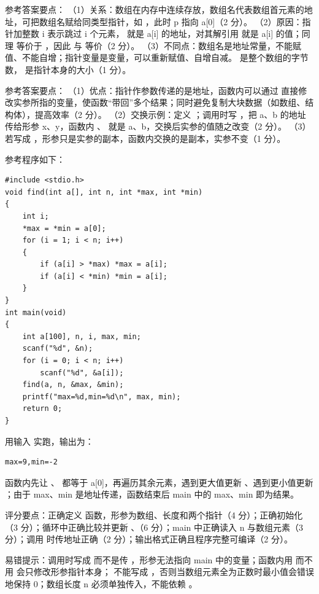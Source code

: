 \documentclass[a4paper,11pt]{article}
\begin{document}
\q 参考答案要点：
（1）关系：数组在内存中连续存放，数组名代表数组首元素的地址，可把数组名赋给同类型指针，如 ，此时 p 指向 a[0]（2 分）。
（2）原因：指针加整数 i 表示跳过 i 个元素， 就是 a[i] 的地址，对其解引用  就是 a[i] 的值；同理  等价于 ，因此  与  等价（2 分）。
（3）不同点：数组名是地址常量，不能赋值、不能自增；指针变量是变量，可以重新赋值、自增自减。 是整个数组的字节数， 是指针本身的大小（1 分）。

\q 参考答案要点：
（1）优点：指针作参数传递的是地址，函数内可以通过  直接修改实参所指的变量，使函数“带回”多个结果；同时避免复制大块数据（如数组、结构体），提高效率（2 分）。
（2）交换示例：定义 ；调用时写 ，把 a、b 的地址传给形参 x、y，函数内 、 就是 a、b，交换后实参的值随之改变（2 分）。
（3）若写成 ，形参只是实参的副本，函数内交换的是副本，实参不变（1 分）。


\q 参考程序如下：
\begin{lstlisting}[language={[custom]C}]
#include <stdio.h>
void find(int a[], int n, int *max, int *min)
{
    int i;
    *max = *min = a[0];
    for (i = 1; i < n; i++)
    {
        if (a[i] > *max) *max = a[i];
        if (a[i] < *min) *min = a[i];
    }
}
int main(void)
{
    int a[100], n, i, max, min;
    scanf("%d", &n);
    for (i = 0; i < n; i++)
        scanf("%d", &a[i]);
    find(a, n, &max, &min);
    printf("max=%d,min=%d\n", max, min);
    return 0;
}
\end{lstlisting}
\begin{analysis}用输入  实跑，输出为：
\begin{lstlisting}
max=9,min=-2
\end{lstlisting}
函数内先让 、 都等于 a[0]，再遍历其余元素，遇到更大值更新 、遇到更小值更新 ；由于 max、min 是地址传递，函数结束后 main 中的 max、min 即为结果。\end{analysis}
\begin{analysis}评分要点：正确定义  函数，形参为数组、长度和两个指针（4 分）；正确初始化 （3 分）；循环中正确比较并更新 、（6 分）；main 中正确读入 n 与数组元素（3 分）；调用  时传地址正确（2 分）；输出格式正确且程序完整可编译（2 分）。\end{analysis}
\begin{analysis}易错提示：调用时写成  而不是传 ，形参无法指向 main 中的变量；函数内用  而不用  会只修改形参指针本身； 不能写成 ，否则当数组元素全为正数时最小值会错误地保持 0；数组长度 n 必须单独传入，不能依赖 。\end{analysis}
\end{document}
